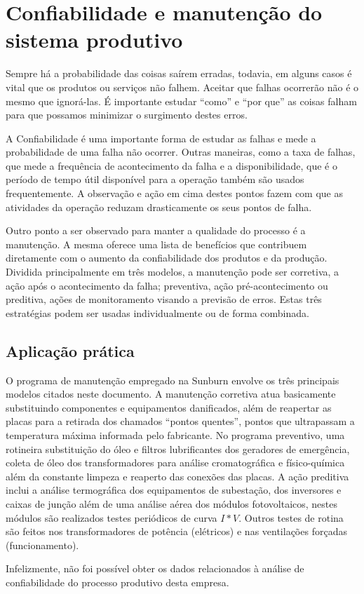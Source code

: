 \chapter{Confiabilidade e manutenção do sistema produtivo}
\label{chap:confiabilidade_manutencao_do_sistema_produtivo}
Sempre há a probabilidade das coisas saírem erradas, todavia, em alguns casos é vital que os produtos ou serviços não falhem. Aceitar que falhas ocorrerão não é o mesmo que ignorá-las. É importante estudar ``como'' e ``por que'' as coisas falham para que possamos minimizar o surgimento destes erros.

A Confiabilidade é uma importante forma de estudar as falhas e mede a probabilidade de uma falha não ocorrer. Outras maneiras, como a taxa de falhas, que mede a frequência de acontecimento da falha e a disponibilidade, que é o período de tempo útil disponível para a operação também são usados frequentemente. A observação e ação em cima destes pontos fazem com que as atividades da operação reduzam drasticamente os seus pontos de falha.

Outro ponto a ser observado para manter a qualidade do processo é a manutenção. A mesma oferece uma lista de benefícios que contribuem diretamente com o aumento da confiabilidade dos produtos e da produção. Dividida principalmente em três modelos, a manutenção pode ser corretiva, a ação após o acontecimento da falha; preventiva, ação pré-acontecimento ou preditiva, ações de monitoramento visando a previsão de erros. Estas três estratégias podem ser usadas individualmente ou de forma combinada.


\section{Aplicação prática}
\label{sec:confiabilidade_manutencao_aplicacao}

O programa de manutenção empregado na Sunburn envolve os três principais modelos citados neste documento. A manutenção corretiva atua basicamente substituindo componentes e equipamentos danificados, além de reapertar as placas para a retirada dos chamados ``pontos quentes'', pontos que ultrapassam a temperatura máxima informada pelo fabricante. No programa preventivo, uma rotineira substituição do óleo e filtros lubrificantes dos geradores de emergência, coleta de óleo dos transformadores para análise cromatográfica e físico-química além da constante limpeza e reaperto das conexões das placas. A ação preditiva inclui a análise termográfica dos equipamentos de subestação, dos inversores e caixas de junção além de uma análise aérea dos módulos fotovoltaicos, nestes módulos são realizados testes periódicos de curva $I * V$. Outros testes de rotina são feitos nos transformadores de potência (elétricos) e nas ventilações forçadas (funcionamento).

Infelizmente, não foi possível obter os dados relacionados à análise de confiabilidade do processo produtivo desta empresa.